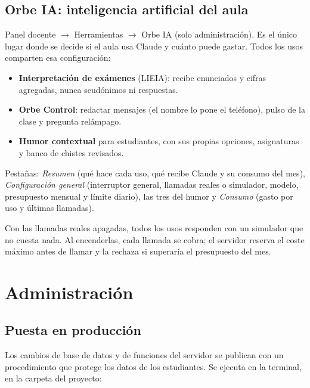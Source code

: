 \documentclass[11pt,a4paper,oneside]{book}
\newcommand{\ruta}[1]{\textsf{#1}}
\begin{document}
\chapter{Orbe IA: inteligencia artificial del aula}
\ruta{Panel docente $\rightarrow$ Herramientas $\rightarrow$ Orbe IA} (solo administración). Es el único lugar donde se
decide si el aula usa Claude y cuánto puede gastar. Todos los usos comparten esa configuración:
\begin{itemize}
  \item \textbf{Interpretación de exámenes} (LIEIA): recibe enunciados y cifras agregadas, nunca seudónimos ni respuestas.
  \item \textbf{Orbe Control}: redactar mensajes (el nombre lo pone el teléfono), pulso de la clase y pregunta relámpago.
  \item \textbf{Humor contextual} para estudiantes, con sus propias opciones, asignaturas y banco de chistes revisados.
\end{itemize}
Pestañas: \emph{Resumen} (qué hace cada uso, qué recibe Claude y su consumo del mes), \emph{Configuración general}
(interruptor general, llamadas reales o simulador, modelo, presupuesto mensual y límite diario), las tres del humor y
\emph{Consumo} (gasto por uso y últimas llamadas).

\begin{importante}
Con las llamadas reales apagadas, todos los usos responden con un simulador que no cuesta nada. Al encenderlas, cada
llamada se cobra; el servidor reserva el coste máximo antes de llamar y la rechaza si superaría el presupuesto del mes.
\end{importante}

\part{Administración}

\chapter{Puesta en producción}
Los cambios de base de datos y de funciones del servidor se publican con un procedimiento que protege los datos de
los estudiantes. Se ejecuta en la terminal, en la carpeta del proyecto:
\end{document}
